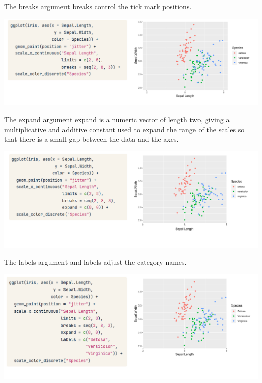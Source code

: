\documentclass[
  ignorenonframetext,
]{beamer}
\begin{document}
\begin{frame}{The breaks argument}
\label{the-breaks-argument}
breaks control the tick mark positions.

\includegraphics{../images/im162.png}
\end{frame}

\begin{frame}{The expand argument}
\label{the-expand-argument}
expand is a numeric vector of length two, giving a multiplicative and
additive constant used to expand the range of the scales so that there
is a small gap between the data and the axes.

\includegraphics{../images/im163.png}
\end{frame}

\begin{frame}{The labels argument}
\label{the-labels-argument}
and labels adjust the category names.

\includegraphics{../images/im164.png}
\end{frame}
\end{document}
